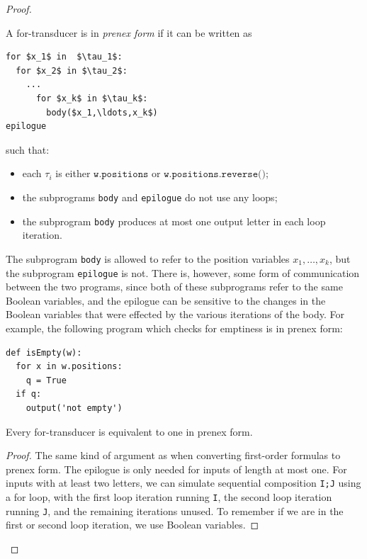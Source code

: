 \begin{proof}
\begin{definition}
\label{def:prenex-normal-form-for-transducers}
A for-transducer is in \emph{prenex form} if it can be written as
\begin{lstlisting}
for $x_1$ in  $\tau_1$:
  for $x_2$ in $\tau_2$:
    ...
      for $x_k$ in $\tau_k$:
        body($x_1,\ldots,x_k$)
epilogue
            \end{lstlisting}
such that: 
\begin{itemize}
  \item each $\tau_i$ is either $\texttt{w.positions}$ or $\texttt{w.positions.reverse()}$;
  \item the subprograms {\tt body} and {\tt epilogue} do not use any loops;
  \item the subprogram {\tt body} produces at most one output letter in each loop iteration.
\end{itemize}
\end{definition}
The subprogram {\tt body} is allowed to refer to the position variables $x_1,\ldots,x_k$, but the subprogram {\tt epilogue} is not. There is, however, some form of communication between the two programs, since both of these subprograms refer to the same Boolean variables, and the epilogue can be sensitive to the changes in the Boolean variables that were effected by the various iterations of the body. For example, the following program which checks for emptiness is in prenex  form: 
\begin{lstlisting}
def isEmpty(w):
  for x in w.positions:
    q = True
  if q:
    output('not empty')
\end{lstlisting}

        \begin{lemma}\label{lem:prenex-normal-form}
            Every for-transducer is equivalent to one in prenex  form.
        \end{lemma}
        \begin{proof}
            The same kind of argument as when converting first-order formulas to prenex  form. The epilogue is only needed for inputs of length at most one. For inputs with at least two letters, we can simulate  sequential composition \texttt{I;J} using a for loop, with the first loop iteration running \texttt{I}, the second loop iteration running \texttt{J}, and the remaining iterations unused. To remember if we are in the first or second loop iteration, we use Boolean variables.
        \end{proof}


\end{proof}
